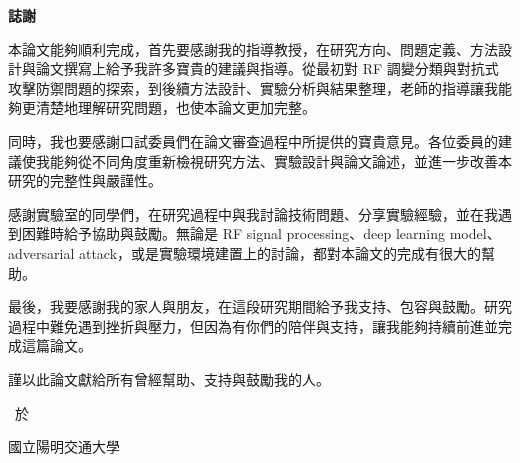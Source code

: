 \thispagestyle{empty}

\begin{center}
\Large
\textbf{誌\hspace{1cm}謝}
\end{center}

\vspace{1cm}
\linespread{2}%
\selectfont
\hspace{0.25cm}

本論文能夠順利完成，首先要感謝我的指導教授，在研究方向、問題定義、方法設計與論文撰寫上給予我許多寶貴的建議與指導。從最初對 RF 調變分類與對抗式攻擊防禦問題的探索，到後續方法設計、實驗分析與結果整理，老師的指導讓我能夠更清楚地理解研究問題，也使本論文更加完整。

同時，我也要感謝口試委員們在論文審查過程中所提供的寶貴意見。各位委員的建議使我能夠從不同角度重新檢視研究方法、實驗設計與論文論述，並進一步改善本研究的完整性與嚴謹性。

感謝實驗室的同學們，在研究過程中與我討論技術問題、分享實驗經驗，並在我遇到困難時給予協助與鼓勵。無論是 RF signal processing、deep learning model、adversarial attack，或是實驗環境建置上的討論，都對本論文的完成有很大的幫助。

最後，我要感謝我的家人與朋友，在這段研究期間給予我支持、包容與鼓勵。研究過程中難免遇到挫折與壓力，但因為有你們的陪伴與支持，讓我能夠持續前進並完成這篇論文。

謹以此論文獻給所有曾經幫助、支持與鼓勵我的人。

\vspace{3cm}
\begin{flushright}
\studentCnName \ 於

國立陽明交通大學\ \NameofDepartmentInstituteCN

\ThesisDateTW
\end{flushright}
